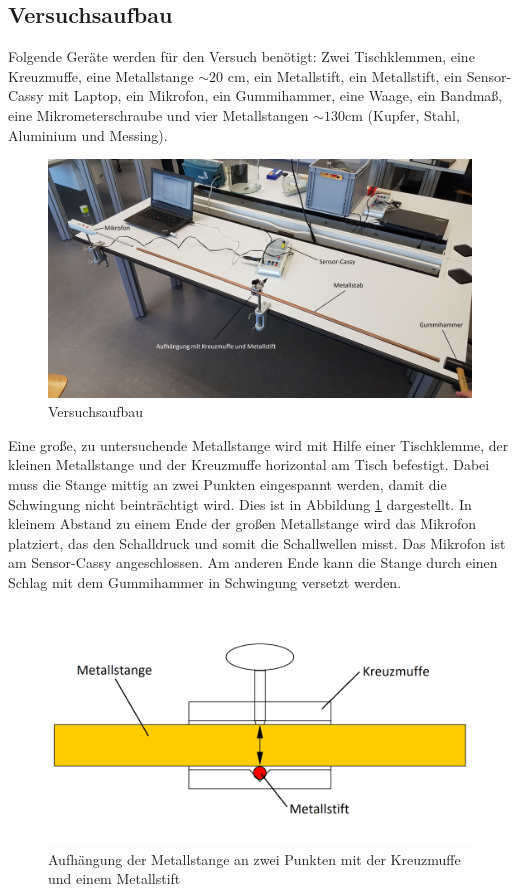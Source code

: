 \documentclass[a4paper, 12pt]{scrartcl}
\begin{document}
\subsection{Versuchsaufbau}

Folgende Geräte werden für den Versuch benötigt: Zwei Tischklemmen, eine Kreuzmuffe, eine Metallstange $\sim 20$ cm, ein Metallstift, ein Metallstift, ein Sensor-Cassy mit Laptop, ein Mikrofon, ein Gummihammer, eine Waage, ein Bandmaß, eine Mikrometerschraube und vier Metallstangen $\sim 130$cm (Kupfer, Stahl, Aluminium und Messing).

\begin{figure}[h]
	\centering
	\includegraphics[width=\linewidth]{bilder/aufbau_festkoerper.jpg}
	\caption{Versuchsaufbau}
\end{figure}

Eine große, zu untersuchende Metallstange wird mit Hilfe einer Tischklemme, der kleinen Metallstange und der Kreuzmuffe horizontal am Tisch befestigt. Dabei muss die Stange mittig an zwei Punkten eingespannt werden, damit die Schwingung nicht beinträchtigt wird. Dies ist in Abbildung \ref{pic:aufhaengung} dargestellt. In kleinem Abstand zu einem Ende der großen Metallstange wird das Mikrofon platziert, das den Schalldruck und somit die Schallwellen misst. Das Mikrofon ist am Sensor-Cassy angeschlossen. Am anderen Ende kann die Stange durch einen Schlag mit dem Gummihammer in Schwingung versetzt werden.

\begin{figure}[H]
	\centering
	\includegraphics[width=\linewidth]{bilder/aufhaengung_beschriftet.png}
	\caption{Aufhängung der Metallstange an zwei Punkten mit der Kreuzmuffe und einem Metallstift}
	\label{pic:aufhaengung}
\end{figure}
\end{document}
